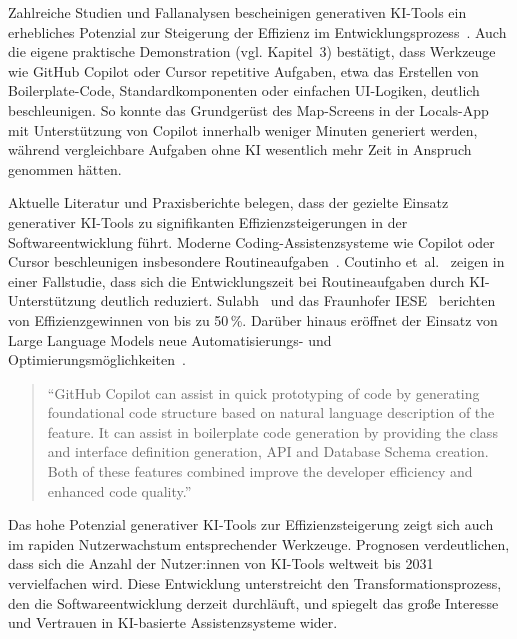 Zahlreiche Studien und Fallanalysen bescheinigen generativen KI-Tools ein
erhebliches Potenzial zur Steigerung der Effizienz im
Entwicklungsprozess~\cite{donvir_role_2024,coutinho_role_2024,s_future_2024,esposito_generative_2025,braun_ki_2024,siebert_generative_2024}.
Auch die eigene praktische Demonstration (vgl. Kapitel~3) bestätigt, dass
Werkzeuge wie GitHub Copilot oder Cursor repetitive Aufgaben, etwa das
Erstellen von Boilerplate-Code, Standardkomponenten oder einfachen UI-Logiken,
deutlich beschleunigen. So konnte das Grundgerüst des Map-Screens in der
Locals-App mit Unterstützung von Copilot innerhalb weniger Minuten generiert
werden, während vergleichbare Aufgaben ohne KI wesentlich mehr Zeit in Anspruch
genommen hätten.

Aktuelle Literatur und Praxisberichte belegen, dass der gezielte Einsatz
generativer KI-Tools zu signifikanten Effizienzsteigerungen in der
Softwareentwicklung führt. Moderne Coding-Assistenzsysteme wie Copilot oder
Cursor beschleunigen insbesondere Routineaufgaben~\cite{donvir_role_2024}.
Coutinho et~al.~\cite{coutinho_role_2024} zeigen in einer Fallstudie, dass sich
die Entwicklungszeit bei Routineaufgaben durch KI-Unterstützung deutlich
reduziert. Sulabh~\cite{s_future_2024} und das Fraunhofer
IESE~\cite{siebert_generative_2024} berichten von Effizienzgewinnen von bis zu
50\,\%. Darüber hinaus eröffnet der Einsatz von Large Language Models neue
Automatisierungs- und
Optimierungsmöglichkeiten~\cite{esposito_generative_2025}.

\begin{quote}
    \enquote{GitHub Copilot can assist in quick prototyping of code by generating foundational code structure based on natural language description of the feature. It can assist in boilerplate code generation by providing the class and interface definition generation, API and Database Schema creation. Both of these features combined improve the developer efficiency and enhanced code quality.}
    \cite[S.~4]{donvir_role_2024}
\end{quote}

Das hohe Potenzial generativer KI-Tools zur Effizienzsteigerung zeigt sich auch
im rapiden Nutzerwachstum entsprechender Werkzeuge. Prognosen verdeutlichen,
dass sich die Anzahl der Nutzer:innen von KI-Tools weltweit bis 2031
vervielfachen wird. Diese Entwicklung unterstreicht den Transformationsprozess,
den die Softwareentwicklung derzeit durchläuft, und spiegelt das große
Interesse und Vertrauen in KI-basierte Assistenzsysteme wider.

